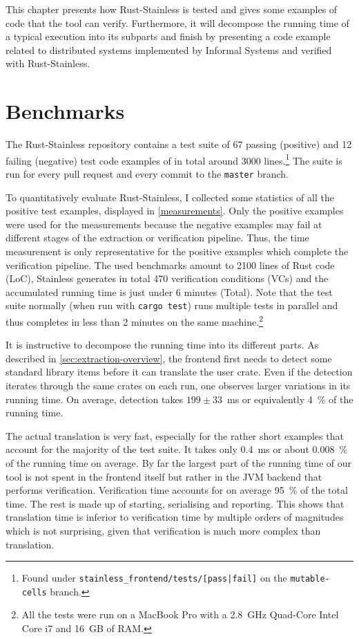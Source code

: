 This chapter presents how Rust-Stainless is tested and gives some examples of
code that the tool can verify. Furthermore, it will decompose the running time
of a typical execution into its subparts and finish by presenting a code example
related to distributed systems implemented by Informal Systems and verified with
Rust-Stainless.

\section{Benchmarks}

The Rust-Stainless repository contains a test suite of 67 passing (positive) and
12 failing (negative) test code examples of in total around 3000
lines.\footnote{Found under \texttt{stainless\_frontend/tests/[pass|fail]} on
the \texttt{mutable-cells} branch.} The suite is run for every pull request and
every commit to the \texttt{master} branch.

To quantitatively evaluate Rust-Stainless, I collected some statistics of all
the positive test examples, displayed in \autoref{measurements}. Only the
positive examples were used for the measurements because the negative examples
may fail at different stages of the extraction or verification pipeline. Thus,
the time measurement is only representative for the positive examples which
complete the verification pipeline. The used benchmarks amount to 2100 lines of
Rust code (LoC), Stainless generates in total 470 verification conditions (VCs)
and the accumulated running time is just under 6 minutes (Total). Note that the
test suite normally (when run with \texttt{cargo test}) runs multiple tests in
parallel and thus completes in less than 2 minutes on the same
machine.\footnote{All the tests were run on a MacBook Pro with a 2.8~GHz
Quad-Core Intel Core i7 and 16~GB of RAM.}

It is instructive to decompose the running time into its different parts. As
described in \autoref{sec:extraction-overview}, the frontend first needs to
detect some standard library items before it can translate the user crate. Even
if the detection iterates through the same crates on each run, one observes
larger variations in its running time. On average, detection takes $199 \pm
33$~ms or equivalently 4~\% of the running time.

The actual translation is very fast, especially for the rather short examples
that account for the majority of the test suite. It takes only 0.4~ms or about
0.008~\% of the running time on average. By far the largest part of the running
time of our tool is not spent in the frontend itself but rather in the JVM
backend that performs verification. Verification time accounts for on average
95~\% of the total time. The rest is made up of starting, serialising and
reporting. This shows that translation time is inferior to verification time by
multiple orders of magnitudes which is not surprising, given that verification
is much more complex than translation.

